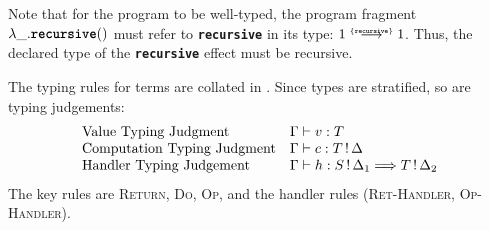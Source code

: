 Note that for the program to be well-typed, the program fragment $\lambda \_. \textbf{\texttt{recursive}} ()$ must refer to \textbf{\texttt{recursive}} in its type: $\functionType[\{ \texttt{recursive} \}]{1}{1}$. Thus, the declared type of the \textbf{\texttt{recursive}} effect must be recursive. 

The typing rules for terms are collated in . Since types are stratified, so are typing judgements:
\[
\begin{array}{ll}
  \text{Value Typing Judgment} & \Gamma \vdash v: T  \\
  \text{Computation Typing Judgment} & \Gamma \vdash c: \effectType{T}  \\
  \text{Handler Typing Judgement} & \Gamma \vdash h: \handlerType{\effectType[\Delta_1]{S}}{\effectType[\Delta_2]{T}} 
\end{array}
\]
The key rules are \textsc{Return}, \textsc{Do}, \textsc{Op}, and the handler rules (\textsc{Ret-Handler}, \textsc{Op-Handler}).

